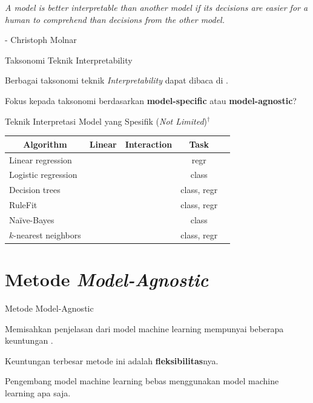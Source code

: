 \documentclass[aspectratio=169]{beamer}
\newcommand{\cmark}{\ding{51}}%
\newcommand{\xmark}{\ding{55}}%
\begin{document}
\begin{frame}
	\centering
	\textit{A model is better interpretable than another model if its decisions are easier for a human to comprehend than decisions from the other model.}
	
	\bigskip
	- Christoph Molnar
\end{frame}

\begin{frame}{Taksonomi Teknik Interpretability}
    \begin{vfilleditems}
	\item Berbagai taksonomi teknik \textit{Interpretability} dapat dibaca di \citet{molnar2022}.
	\item Fokus kepada taksonomi berdasarkan \textbf{model-specific} atau \textbf{model-agnostic}?
\end{vfilleditems}	
\end{frame}

\begin{frame}{Teknik Interpretasi Model yang Spesifik (\textit{Not Limited})$^\dagger$}
\begin{table}[!ht]
	\centering
	\begin{tabular}{|l|c|c|c|l|}
		\hline
		\multicolumn{1}{|c|}{\textbf{Algorithm}} & \multicolumn{1}{c|}{\textbf{Linear}} & \multicolumn{1}{c|}{\textbf{Interaction}} & \multicolumn{1}{c|}{\textbf{Task}} \\
		\hline
		Linear regression   & \cmark  & \xmark & regr \\
		\hline
		Logistic regression & \xmark  & \xmark      & class \\
		\hline
		Decision trees      & \xmark       & \cmark & class, regr \\
		\hline
		RuleFit & \cmark & \cmark   & class, regr \\
		\hline
		Na\"{i}ve-Bayes     & \xmark  & \xmark & class \\
		\hline
		$k$-nearest neighbors      & \xmark  & \xmark & class, regr \\
		\hline
	\end{tabular}
\end{table}
\end{frame}

\section{Metode \textit{Model-Agnostic}}
\begin{frame}{Metode Model-Agnostic}
	\begin{vfilleditems}
		\item Memisahkan penjelasan dari model machine learning mempunyai beberapa keuntungan \citep{ribeiro2016model}.
		\item Keuntungan terbesar metode ini adalah \textbf{fleksibilitas}nya.
		\item Pengembang model machine learning bebas menggunakan model machine learning apa saja.
	\end{vfilleditems}
\end{frame}
\end{document}
